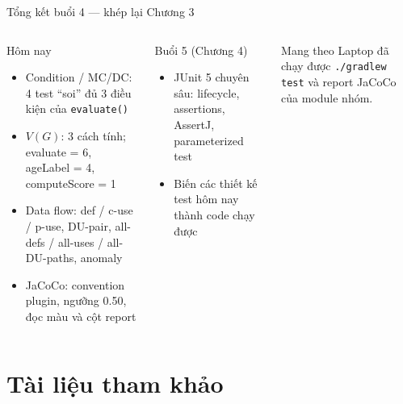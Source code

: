 \documentclass[aspectratio=169,12pt]{beamer}
\begin{document}
\begin{frame}{Tổng kết buổi 4 --- khép lại Chương 3}
  \begin{columns}[T]
    \begin{block}{Hôm nay}
      \begin{itemize}
        \item \small Condition / MC/DC: 4 test ``soi'' đủ 3 điều kiện
              của \texttt{evaluate()}
        \item \small $V(G)$: 3 cách tính; evaluate = 6,
              ageLabel = 4, computeScore = 1
        \item \small Data flow: def / c-use / p-use, DU-pair,
              all-defs / all-uses / all-DU-paths, anomaly
        \item \small JaCoCo: convention plugin, ngưỡng 0.50,
              đọc màu và cột report
      \end{itemize}
    \end{block}

    \begin{block}{Buổi 5 (Chương 4)}
      \begin{itemize}
        \item \small JUnit 5 chuyên sâu: lifecycle, assertions,
              AssertJ, parameterized test
        \item \small Biến các thiết kế test hôm nay thành code chạy được
      \end{itemize}
    \end{block}

    \begin{alertblock}{Mang theo}
      \small Laptop đã chạy được \texttt{./gradlew test}
      và report JaCoCo của module nhóm.
    \end{alertblock}
  \end{columns}
\end{frame}

\section{Tài liệu tham khảo}
\end{document}
